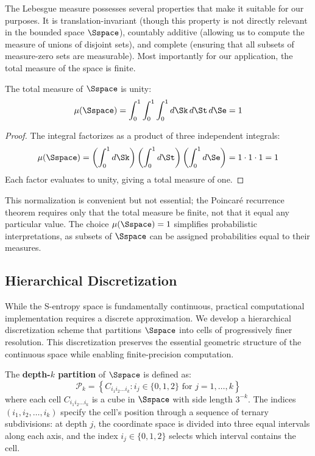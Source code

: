 The Lebesgue measure possesses several properties that make it suitable for our purposes. It is translation-invariant (though this property is not directly relevant in the bounded space $\Sspace$), countably additive (allowing us to compute the measure of unions of disjoint sets), and complete (ensuring that all subsets of measure-zero sets are measurable). Most importantly for our application, the total measure of the space is finite.

\begin{proposition}
\label{prop:finite_measure}
The total measure of $\Sspace$ is unity:
\begin{equation}
\mu(\Sspace) = \int_0^1 \int_0^1 \int_0^1 d\Sk \, d\St \, d\Se = 1
\label{eq:total_measure}
\end{equation}
\end{proposition}

\begin{proof}
The integral factorizes as a product of three independent integrals:
\begin{equation}
\mu(\Sspace) = \left(\int_0^1 d\Sk\right) \left(\int_0^1 d\St\right) \left(\int_0^1 d\Se\right) = 1 \cdot 1 \cdot 1 = 1
\end{equation}
Each factor evaluates to unity, giving a total measure of one.
\end{proof}

This normalization is convenient but not essential; the Poincaré recurrence theorem requires only that the total measure be finite, not that it equal any particular value. The choice $\mu(\Sspace) = 1$ simplifies probabilistic interpretations, as subsets of $\Sspace$ can be assigned probabilities equal to their measures.

\subsection{Hierarchical Discretization}

While the S-entropy space is fundamentally continuous, practical computational implementation requires a discrete approximation. We develop a hierarchical discretization scheme that partitions $\Sspace$ into cells of progressively finer resolution. This discretization preserves the essential geometric structure of the continuous space while enabling finite-precision computation.

\begin{definition}
\label{def:hierarchical_partition}
The \textbf{depth-$k$ partition} of $\Sspace$ is defined as:
\begin{equation}
\mathcal{P}_k = \left\{ C_{i_1 i_2 \ldots i_k} : i_j \in \{0, 1, 2\} \text{ for } j = 1, \ldots, k \right\}
\label{eq:partition_definition}
\end{equation}
where each cell $C_{i_1 i_2 \ldots i_k}$ is a cube in $\Sspace$ with side length $3^{-k}$. The indices $(i_1, i_2, \ldots, i_k)$ specify the cell's position through a sequence of ternary subdivisions: at depth $j$, the coordinate space is divided into three equal intervals along each axis, and the index $i_j \in \{0,1,2\}$ selects which interval contains the cell.
\end{definition}

